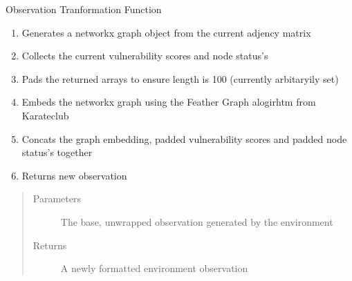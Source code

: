 \documentclass[letterpaper,10pt,english]{sphinxmanual}
\begin{document}
\begin{fulllineitems}
\begin{fulllineitems}
\label{\detokenize{source/yawning_titan.envs.generic.wrappers:yawning_titan.envs.generic.wrappers.graph_embedding_observations.FeatherGraphEmbedObservation.observation}}
\sphinxAtStartPar
Observation Tranformation Function
\begin{enumerate}
%
\item {}
\sphinxAtStartPar
Generates a networkx graph object from the current adjency matrix

\item {}
\sphinxAtStartPar
Collects the current vulnerability scores and node status’s

\item {}
\sphinxAtStartPar
Pads the returned arrays to ensure length is 100 (currently arbitaryily set)

\item {}
\sphinxAtStartPar
Embeds the networkx graph using the Feather Graph alogirhtm from Karateclub

\item {}
\sphinxAtStartPar
Concats the graph embedding, padded vulnerability scores and padded node status’s together

\item {}
\sphinxAtStartPar
Returns new observation

\end{enumerate}
\begin{quote}\begin{description}
\item[{Parameters}] \leavevmode
\sphinxAtStartPar
{} \textendash{} The base, unwrapped observation generated by the environment

\item[{Returns}] \leavevmode
\sphinxAtStartPar
A newly formatted environment observation

\end{description}\end{quote}

\end{fulllineitems}


\end{fulllineitems}
\end{document}
